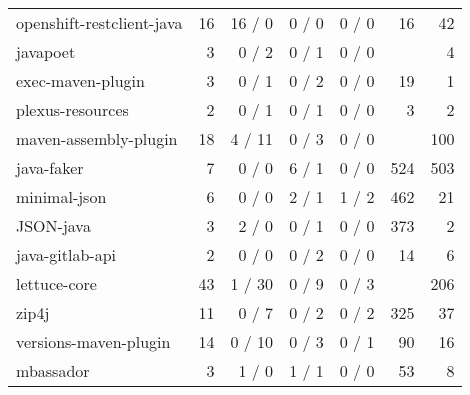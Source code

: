 \begin{table*}[]
\begin{tabular*}{\linewidth}[t]{lrrrrrr}
        openshift-restclient-java   & 16                 & 16 / 0                & 0 / 0                & 0 / 0    & 16    & 42                   \\ 
        javapoet                    & 3                  & 0 / 2                 & 0 / 1                & 0 / 0    &       & 4                    \\ 
        exec-maven-plugin           & 3                  & 0 / 1                 & 0 / 2                & 0 / 0    & 19    & 1                    \\ 
        plexus-resources            & 2                  & 0 / 1                 & 0 / 1                & 0 / 0    & 3     & 2                    \\ 
        maven-assembly-plugin       & 18                 & 4 / 11                & 0 / 3                & 0 / 0    &       & 100                  \\ 
        java-faker                  & 7                  & 0 / 0                 & 6 / 1                & 0 / 0    & 524   & 503                  \\ 
        minimal-json                & 6                  & 0 / 0                 & 2 / 1                & 1 / 2    & 462   & 21                   \\ 
        JSON-java                   & 3                  & 2 / 0                 & 0 / 1                & 0 / 0    & 373   & 2                    \\ 
        java-gitlab-api             & 2                  & 0 / 0                 & 0 / 2                & 0 / 0    & 14    & 6                    \\ 
        lettuce-core                & 43                 & 1 / 30                & 0 / 9                & 0 / 3    &       & 206                  \\ 
        zip4j                       & 11                 & 0 / 7                 & 0 / 2                & 0 / 2    & 325   & 37                   \\ 
        versions-maven-plugin       & 14                 & 0 / 10                & 0 / 3                & 0 / 1    & 90    & 16                   \\ 
        mbassador                   & 3                  & 1 / 0                 & 1 / 1                & 0 / 0  & 53    & 8
    \end{tabular*}
\end{table*}


